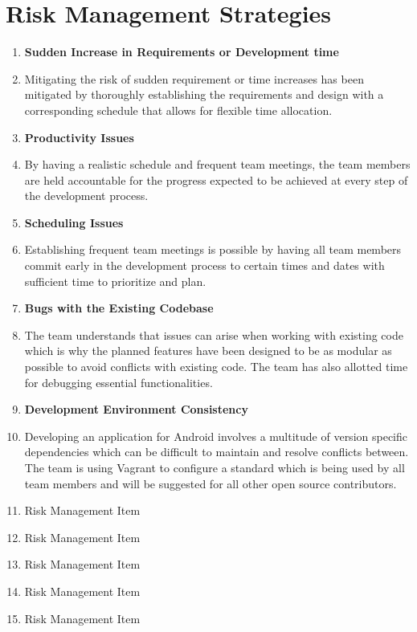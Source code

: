 \documentclass{scrreprt}
\begin{document}
\section{Risk Management Strategies}
\begin{enumerate}
	\item[] \textbf{Sudden Increase in Requirements or Development time}
	\item Mitigating the risk of sudden requirement or time increases has been mitigated by thoroughly establishing the requirements and design with a corresponding schedule that allows for flexible time allocation.
	\item[] \textbf{Productivity Issues}
	\item By having a realistic schedule and frequent team meetings, the team members are held accountable for the progress expected to be achieved at every step of the development process.

	\item[] \textbf{Scheduling Issues}
	\item Establishing frequent team meetings is possible by having all team members commit early in the development process to certain times and dates with sufficient time to prioritize and plan.

	\item[] \textbf{Bugs with the Existing Codebase}
	\item The team understands that issues can arise when working with existing code which is why the planned features have been designed to be as modular as possible to avoid conflicts with existing code. The team has also allotted time for debugging essential functionalities.
	\item[] \textbf{Development Environment Consistency}
	\item Developing an application for Android involves a multitude of version specific dependencies which can be difficult to maintain and resolve conflicts between. The team is using Vagrant to configure a standard which is being used by all team members and will be suggested for all other open source contributors.

	\item Risk Management Item
	\item Risk Management Item
	\item Risk Management Item
	\item Risk Management Item
	\item Risk Management Item
\end{enumerate}
\end{document}
